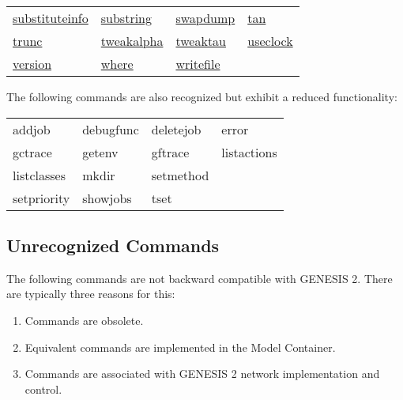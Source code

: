 \documentclass[12pt]{article}
\begin{document}
\begin{tabular}{l l l l}
\href{http://genesis-sim.org/GENESIS/Hyperdoc/Manual-25.html#ss25.185}{substituteinfo}    & \href{http://genesis-sim.org/GENESIS/Hyperdoc/Manual-25.html#ss25.186}{substring}              & \href{http://genesis-sim.org/GENESIS/Hyperdoc/Manual-25.html#ss25.187}{swapdump}& \href{http://genesis-sim.org/GENESIS/Hyperdoc/Manual-25.html#ss25.190}{tan} 	\\
\href{http://genesis-sim.org/GENESIS/Hyperdoc/Manual-25.html#ss25.191}{trunc}                   & \href{http://genesis-sim.org/GENESIS/Hyperdoc/Manual-25.html#ss25.192}{tweakalpha}         & \href{http://genesis-sim.org/GENESIS/Hyperdoc/Manual-25.html#ss25.193}{tweaktau}    & \href{http://genesis-sim.org/GENESIS/Hyperdoc/Manual-25.html#ss25.194}{useclock} \\
\href{http://genesis-sim.org/GENESIS/Hyperdoc/Manual-25.html#ss25.195}{version}              & \href{http://genesis-sim.org/GENESIS/Hyperdoc/Manual-25.html#ss25.201}{where}                    & \href{http://genesis-sim.org/GENESIS/Hyperdoc/Manual-25.html#ss25.203}{writefile}      &   \\
\end{tabular}

The following commands are also recognized but exhibit a reduced functionality:

\begin{tabular}{l l l l}
addjob 		& debugfunc 	& deletejob 	& error				\\
gctrace 		& getenv 		& gftrace 		& listactions			\\
listclasses		& mkdir 		& setmethod	& 	\\
setpriority		& showjobs 	& tset		&  					\\
\end{tabular}
 
\subsection*{Unrecognized Commands}

The following commands are not backward compatible with GENESIS 2. There are typically three reasons for this:
\begin{enumerate}
\item Commands are obsolete.
\item Equivalent commands are implemented in the Model Container.
\item Commands are associated with GENESIS 2 network implementation and control. 
\end{enumerate}
\end{document}
